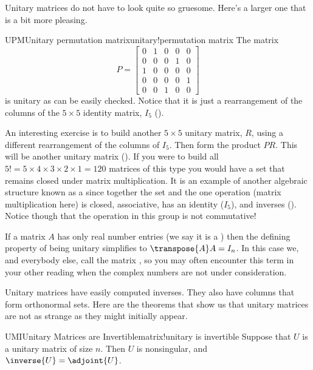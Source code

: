 %
%
Unitary matrices do not have to look quite so gruesome.  Here's a larger one that is a bit more pleasing.
%
\begin{example}{UPM}{Unitary permutation matrix}{unitary!permutation matrix}
The matrix
%
\begin{equation*}
P=
\begin{bmatrix}
0&1&0&0&0\\
0&0&0&1&0\\
1&0&0&0&0\\
0&0&0&0&1\\
0&0&1&0&0
\end{bmatrix}
\end{equation*}
%
is unitary as can be easily checked.  Notice that it is just a rearrangement of the columns of the $5\times 5$ identity matrix, $I_5$ ().\par
%
An interesting exercise is to build another $5\times 5$ unitary matrix, $R$, using a different rearrangement of the columns of $I_5$.  Then form the product $PR$.  This will be another unitary matrix ().  If you were to build all $5!=5\times 4\times 3\times 2\times 1=120$ matrices of this type you would have a set that remains closed under matrix multiplication.  It is an example of another algebraic structure known as a  since together the set and the one operation (matrix multiplication here) is closed, associative, has an identity ($I_5$), and inverses ().  Notice though that the operation in this group is not commutative!
%
\end{example}
%
If a matrix $A$ has only real number entries (we say it is a ) then the defining property of being unitary simplifies to $\transpose{A}A=I_n$.  In this case we, and everybody else, call the matrix , so you may often encounter this term in your other reading when the complex numbers are not under consideration.\par
%
Unitary matrices have easily computed inverses.  They also have columns that form orthonormal sets.  Here are the theorems that show us that unitary matrices are not as strange as they might initially appear.
%
\begin{theorem}{UMI}{Unitary Matrices are Invertible}{matrix!unitary is invertible}
Suppose that $U$ is a unitary matrix of size $n$.  Then $U$ is nonsingular, and $\inverse{U}=\adjoint{U}$.
\end{theorem}

